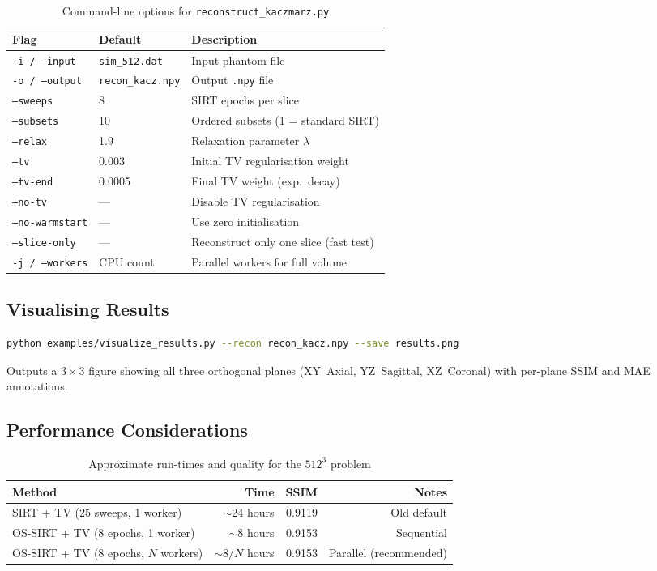\documentclass[11pt,a4paper]{article}
\begin{document}
\begin{table}[h]
\centering
\begin{tabular}{llp{7cm}}
\toprule
\textbf{Flag} & \textbf{Default} & \textbf{Description} \\
\midrule
\texttt{-i / --input} & \texttt{sim\_512.dat} & Input phantom file \\
\texttt{-o / --output} & \texttt{recon\_kacz.npy} & Output \texttt{.npy} file \\
\texttt{--sweeps} & 8 & SIRT epochs per slice \\
\texttt{--subsets} & 10 & Ordered subsets (1 = standard SIRT) \\
\texttt{--relax} & 1.9 & Relaxation parameter $\lambda$ \\
\texttt{--tv} & 0.003 & Initial TV regularisation weight \\
\texttt{--tv-end} & 0.0005 & Final TV weight (exp.~decay) \\
\texttt{--no-tv} & --- & Disable TV regularisation \\
\texttt{--no-warmstart} & --- & Use zero initialisation \\
\texttt{--slice-only} & --- & Reconstruct only one slice (fast test) \\
\texttt{-j / --workers} & CPU count & Parallel workers for full volume \\
\bottomrule
\end{tabular}
\caption{Command-line options for \texttt{reconstruct\_kaczmarz.py}}
\end{table}

\subsection{Visualising Results}

\begin{lstlisting}[language=bash]
python examples/visualize_results.py --recon recon_kacz.npy --save results.png
\end{lstlisting}
Outputs a $3\times 3$ figure showing all three orthogonal planes (XY~Axial, YZ~Sagittal, XZ~Coronal) with per-plane SSIM and MAE annotations.

\subsection{Performance Considerations}

\begin{table}[h]
\centering
\begin{tabular}{lrrr}
\toprule
\textbf{Method} & \textbf{Time} & \textbf{SSIM} & \textbf{Notes} \\
\midrule
SIRT + TV (25 sweeps, 1 worker) & $\sim$24 hours & 0.9119 & Old default \\
OS-SIRT + TV (8 epochs, 1 worker) & $\sim$8 hours & 0.9153 & Sequential \\
OS-SIRT + TV (8 epochs, $N$ workers) & $\sim 8/N$ hours & 0.9153 & Parallel (recommended) \\
\bottomrule
\end{tabular}
\caption{Approximate run-times and quality for the $512^3$ problem}
\end{table}
\end{document}
